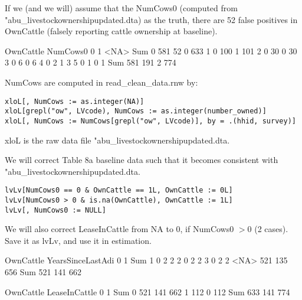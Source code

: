 If we (and we will) assume that the \textsf{NumCows0} (computed from \textsf{"abu\_livestockownershipupdated.dta}) as the truth, there are 52 false positives in \textsf{OwnCattle} (falsely reporting cattle ownership at baseline). 
\begin{Schunk}
\begin{Soutput}
        OwnCattle
NumCows0   0   1 <NA> Sum
     0   581  52    0 633
     1     0 100    1 101
     2     0  30    0  30
     3     0   6    0   6
     4     0   2    1   3
     5     0   1    0   1
     Sum 581 191    2 774
\end{Soutput}
\end{Schunk}
NumCows are computed in \textsf{read\_clean\_data.rnw} by:
\begin{screen}
\verb+xloL[, NumCows := as.integer(NA)]+\\
\verb+xloL[grepl("ow", LVcode), NumCows := as.integer(number_owned)]+\\
\verb+xloL[, NumCows := NumCows[grepl("ow", LVcode)], by = .(hhid, survey)]+
\end{screen}
\textsf{xloL} is the raw data file \textsf{"abu\_livestockownershipupdated.dta}. 

	We will correct Table 8a baseline data such that it becomes consistent with \textsf{"abu\_livestockownershipupdated.dta}. 
\begin{screen}
\verb+lvLv[NumCows0 == 0 & OwnCattle == 1L, OwnCattle := 0L]+\\
\verb+lvLv[NumCows0 > 0 & is.na(OwnCattle), OwnCattle := 1L]+\\
\verb+lvLv[, NumCows0 := NULL]+
\end{screen}
We will also correct \textsf{LeaseInCattle} from NA to 0, if \textsf{NumCows0} $>0$ (2 cases). Save it as \textsf{lvLv}, and use it in estimation.
\begin{Schunk}
\begin{Soutput}
                 OwnCattle
YearsSinceLastAdi   0   1 Sum
             1      0   2   2
             2      0   2   2
             3      0   2   2
             <NA> 521 135 656
             Sum  521 141 662
\end{Soutput}
\begin{Soutput}
             OwnCattle
LeaseInCattle   0   1 Sum
          0   521 141 662
          1   112   0 112
          Sum 633 141 774
\end{Soutput}
\end{Schunk}



